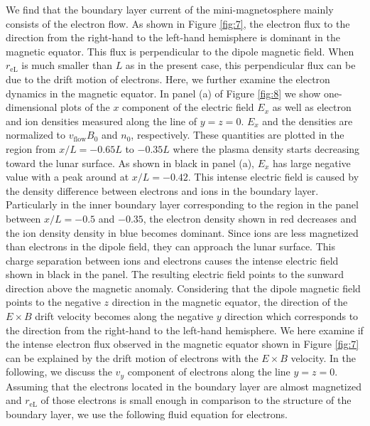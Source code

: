 \documentclass[draft,jgrga]{agutex2015}
\begin{document}
\begin{article}
We find that the boundary layer current of the mini-magnetosphere 
mainly consists of the electron flow. 
As shown in Figure \ref{fig:7}, 
the electron flux 
to the direction from the right-hand to the left-hand hemisphere
is dominant in the magnetic equator.
This flux is perpendicular to the dipole magnetic field. 
When $r_\mathrm{eL}$ is much smaller than $L$ as in the present case,
this perpendicular flux can be due to the drift motion of electrons.
Here, we further examine the electron dynamics in the magnetic equator.
In panel (a) of Figure \ref{fig:8} 
we show one-dimensional plots of the $x$ component of 
the electric field $E_x$ as well as
electron and ion densities measured along the line of $y=z=0$. 
$E_x$ and the densities are normalized to 
$v_\mathrm{flow} B_\mathrm{0}$ and $n_\mathrm{0}$, respectively.
These quantities are plotted in the region from $x/L = -0.65L$ to $-0.35L$
where the plasma density starts decreasing toward the lunar surface.
As shown in black in panel (a), 
$E_x$ has large negative value with 
a peak around at  $x/L = -0.42 $.
This intense electric field is caused by the density difference 
between electrons and ions in the boundary layer.
Particularly in the inner boundary layer 
corresponding to the region in the panel 
between $x/L = -0.5$  and $-0.35$, 
the electron density shown in red decreases and 
the ion density density in blue becomes dominant.
Since ions are less magnetized than electrons in the dipole field, 
they can approach the lunar surface.
This charge separation between ions and electrons
causes the intense electric field shown in black in the panel.
The resulting electric field points to the sunward direction
above the magnetic anomaly.
Considering that the dipole magnetic field points
to the negative $z$ direction in the magnetic equator,
the direction of the $E \times B$ drift velocity becomes 
along the negative $y$ direction 
which corresponds to the direction 
from the right-hand to the left-hand hemisphere.
We here examine if the intense electron flux observed in the magnetic equator
shown in Figure \ref{fig:7} can be explained by the drift motion of electrons
with the $E \times B$ velocity. 
In the following, 
we discuss the $v_y$ component of electrons along the line $y=z=0$.
Assuming that the electrons located in the boundary layer 
are almost magnetized and 
$r_\mathrm{eL}$ of those electrons is small enough in comparison 
to the structure of the boundary layer, 
we use the following fluid equation for electrons.
 

\end{article}
\end{document}
